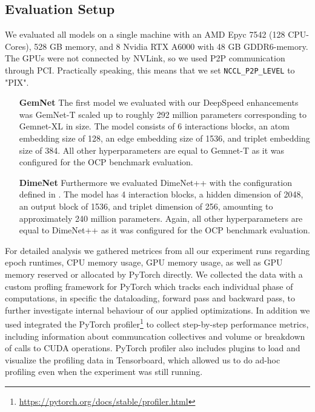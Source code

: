 \subsection{Evaluation Setup}

We evaluated all models on a single machine with an AMD Epyc 7542 (128 CPU-Cores), 528 GB memory, 
and 8 Nvidia RTX A6000 with 48 GB GDDR6-memory. The GPUs were not connected by NVLink, so we used 
P2P communication through PCI. Practically speaking, this means that we set \texttt{NCCL\_P2P\_LEVEL} to 
"PIX".

\begin{enumerate}[align=left]
    \item[\textbf{GemNet}] The first model we evaluated with our DeepSpeed enhancements was GemNet-T 
    scaled up to roughly 292 million parameters corresponding to Gemnet-XL\cite*{https://doi.org/10.48550/arxiv.2203.09697}
    in size. The model consists of 6 interactions blocks, an atom embedding size of 128, an edge 
    embedding size of 1536, and triplet embedding size of 384. All other hyperparameters are equal 
    to Gemnet-T as it was configured for the OCP benchmark evaluation.

    \item[\textbf{DimeNet}] Furthermore we evaluated DimeNet++ with the configuration defined in 
    \cite*{https://doi.org/10.48550/arxiv.2203.09697}. The model has 4 interaction blocks, a hidden 
    dimension of 2048, an output block of 1536, and triplet dimension of 256, amounting to approximately 
    240 million parameters. Again, all other hyperparameters are equal to DimeNet++ as it was configured 
    for the OCP benchmark evaluation.
\end{enumerate}

For detailed analysis we gathered metrices from all our experiment runs regarding epoch runtimes, 
CPU memory usage, GPU memory usage, as well as GPU memory reserved or allocated by PyTorch directly.
We collected the data with a custom profling framework for PyTorch which tracks each individual phase 
of computations, in specific the dataloading, forward pass and backward pass, to further investigate 
internal behaviour of our applied optimizations. 
In addition we used integrated the PyTorch profiler\footnote{\url{https://pytorch.org/docs/stable/profiler.html}}
to collect step-by-step performance metrics, including information about communcation collectives and 
volume or breakdown of calls to CUDA operations. PyTorch profiler also includes plugins to 
load and visualize the profiling data in Tensorboard, which allowed us to do ad-hoc profiling 
even when the experiment was still running.



